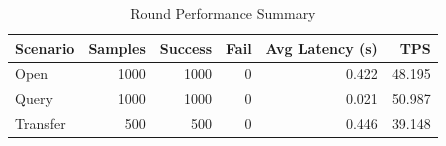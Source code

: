 \begin{table}
\caption{Round Performance Summary}
\label{tab:round_perf}
\begin{tabular}{lrrrrr}
\toprule
Scenario & Samples & Success & Fail & Avg Latency (s) & TPS \\
\midrule
Open & 1000 & 1000 & 0 & 0.422 & 48.195 \\
Query & 1000 & 1000 & 0 & 0.021 & 50.987 \\
Transfer & 500 & 500 & 0 & 0.446 & 39.148 \\
\bottomrule
\end{tabular}
\end{table}
